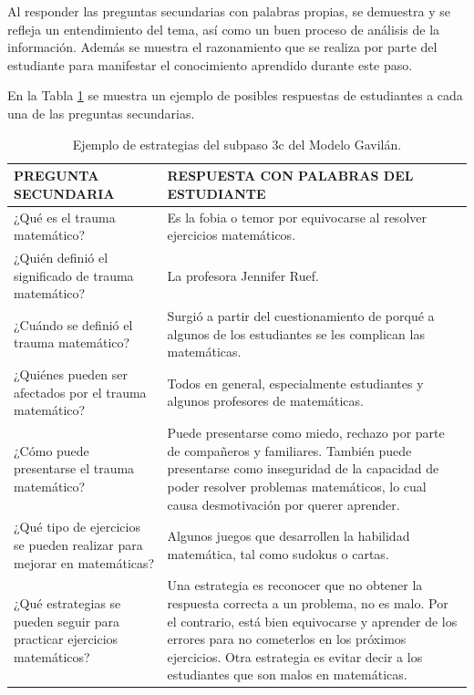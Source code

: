 Al responder las preguntas secundarias con palabras propias, se demuestra y se refleja un entendimiento del tema, así como un buen proceso de análisis de la información. Además se muestra el razonamiento que se realiza por parte del estudiante para manifestar el conocimiento aprendido durante este paso.

En la Tabla \ref{tab:t7} se muestra un ejemplo de posibles respuestas de estudiantes a cada una de las preguntas secundarias.

\begin{table}[H]
  \begin{center}
    \begin{tabular}{ | p{8cm} | p{8cm} | }
      \hline
      PREGUNTA SECUNDARIA & RESPUESTA CON PALABRAS DEL ESTUDIANTE \\ \hline
      ¿Qué es el trauma matemático? & Es la fobia o temor por equivocarse al resolver ejercicios matemáticos. \\ \hline
      ¿Quién definió el significado de trauma matemático? & La profesora Jennifer Ruef. \\ \hline
      ¿Cuándo se definió el trauma matemático? & Surgió a partir del cuestionamiento de porqué a algunos de los estudiantes se les complican las matemáticas. \\ \hline
      ¿Quiénes pueden ser afectados por el trauma matemático? & Todos en general, especialmente estudiantes y algunos profesores de matemáticas. \\ \hline
      ¿Cómo puede presentarse el trauma matemático? & Puede presentarse como miedo, rechazo por parte de compañeros y familiares. También puede presentarse como inseguridad de la capacidad de poder resolver problemas matemáticos, lo cual causa desmotivación por querer aprender. \\ \hline
      ¿Qué tipo de ejercicios se pueden realizar para mejorar en matemáticas? & Algunos juegos que desarrollen la habilidad matemática, tal como sudokus o cartas. \\ \hline
      ¿Qué estrategias se pueden seguir para practicar ejercicios matemáticos? & Una estrategia es reconocer  que no obtener la respuesta correcta a un problema, no es malo. Por el contrario, está bien equivocarse y aprender de los errores para no cometerlos en los próximos ejercicios. Otra estrategia es evitar decir a los estudiantes que son malos en matemáticas.
       \\ \hline
    \end{tabular}
    \caption{Ejemplo de estrategias del subpaso 3c del Modelo Gavilán.}
    \label{tab:t7}
  \end{center}
\end{table}

